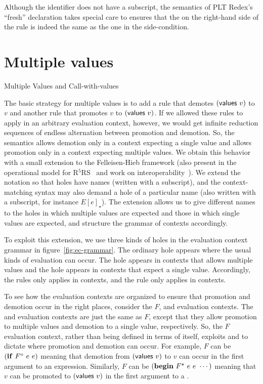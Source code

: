 Although the identifier  does not have a subscript, the semantics of PLT Redex's ``fresh'' declaration takes special care to ensures that the  on the right-hand side of the rule is indeed the same as the one in the side-condition.

\section{Multiple values}

\beginfig
\begin{center}

\end{center}
\caption{Multiple Values and Call-with-values}\label{fig:multiple-values-and-call-with-values}
\endfig

The basic strategy for multiple values is to add a rule that demotes
$(\textnormal{\textsf{values}}~v)$ to $v$ and another rule that promotes
$v$ to $(\textnormal{\textsf{values}}~v)$. If we allowed these rules to apply
in an arbitrary evaluation context, however, we would get infinite
reduction sequences of endless alternation between promotion and
demotion. So, the semantics allows demotion only in a context
expecting a single value and allows promotion only in a context
expecting multiple values. We obtain this behavior with a small
extension to the Felleisen-Hieb framework (also present in the
operational model for R$^5$RS~\cite{mf:op-r5rs} and work on
interoperability~\cite{mf:interop}). We extend the notation so that
holes have names (written with a subscript), and the context-matching
syntax may also demand a hole of a particular name (also written with
a subscript, for instance $E[e]_{\star}$).  The extension
allows us to give different names to the holes in which multiple
values are expected and those in which single values are expected, and
structure the grammar of contexts accordingly.

To exploit this extension, we use three kinds of holes in the
evaluation context grammar in figure~\ref{fig:ec-grammar}. The
ordinary hole \hole{} appears where the usual kinds of
evaluation can occur. The hole \holes{} appears in contexts that
allows multiple values and the hole \holeone{} appears in
contexts that expect a single value. Accordingly, the rules
 only applies in \holes{} contexts, and the
rule  only applies in \holeone{} contexts.

To see how the evaluation contexts are organized to ensure that
promotion and demotion occur in the right places, consider the $F$,
\Fstar{} and \Fo{} evaluation contexts. The \Fstar{} and \Fo{}
evaluation contexts are just the same as $F$, except that they allow
promotion to multiple values and demotion to a single value,
respectively. So, the $F$ evaluation context, rather than being
defined in terms of itself, exploits \Fstar{} and \Fo{} to dictate
where promotion and demotion can occur. For example, $F$ can be
$(\textnormal{\textbf{if}}~F^{\circ}{}~e~e)$ meaning that demotion from $(\textnormal{\textsf{values}}~v)$ to
$v$ can occur in the first argument to an  expression.
Similarly, $F$ can be $(\textnormal{\textbf{begin}}~F^{\star}{}~e~e~\cdots)$ meaning that
$v$ can be promoted to $(\textnormal{\textsf{values}}~v)$ in the first argument to a
.

